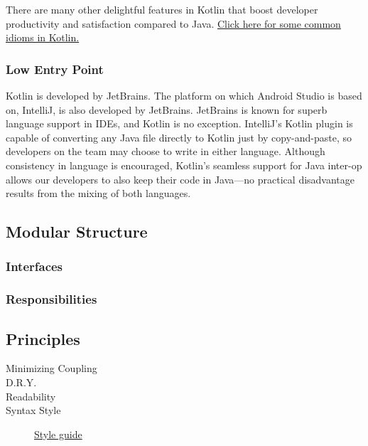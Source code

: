 \documentclass{article}
\begin{document}
There are many other delightful features in Kotlin that boost developer productivity and satisfaction compared to Java. \href{https://kotlinlang.org/docs/reference/idioms.html}{Click here for some common idioms in Kotlin.}

\subsubsection{Low Entry Point}

Kotlin is developed by JetBrains. The platform on which Android Studio is based on, IntelliJ, is also developed by JetBrains. JetBrains is known for superb language support in IDEs, and Kotlin is no exception. IntelliJ's Kotlin plugin is capable of converting any Java file directly to Kotlin just by copy-and-paste, so developers on the team may choose to write in either language. Although consistency in language is encouraged, Kotlin's seamless support for Java inter-op allows our developers to also keep their code in Java---no practical disadvantage results from the mixing of both languages.

\subsection{Modular Structure}

\subsubsection{Interfaces}

\subsubsection{Responsibilities}

\subsection{Principles}

\begin{description}

\item[Minimizing Coupling]

\item[D.R.Y.]

\item[Readability]

\item[Syntax Style]
\href{https://android.github.io/kotlin-guides/style.html}{Style guide}

\end{description}
\end{document}
